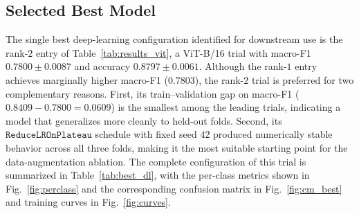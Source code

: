 \documentclass[conference]{IEEEtran}
\begin{document}
\subsection{Selected Best Model}
\label{ssec:best}
The single best deep-learning configuration identified for downstream use is the rank-$2$ entry of Table~\ref{tab:results_vit}, a ViT-B/16 trial with macro-F1 $0.7800 \pm 0.0087$ and accuracy $0.8797 \pm 0.0061$. Although the rank-$1$ entry achieves marginally higher macro-F1 ($0.7803$), the rank-$2$ trial is preferred for two complementary reasons. First, its train--validation gap on macro-F1 ($0.8409 - 0.7800 = 0.0609$) is the smallest among the leading trials, indicating a model that generalizes more cleanly to held-out folds. Second, its $\texttt{ReduceLROnPlateau}$ schedule with fixed seed $42$ produced numerically stable behavior across all three folds, making it the most suitable starting point for the data-augmentation ablation. The complete configuration of this trial is summarized in Table~\ref{tab:best_dl}, with the per-class metrics shown in Fig.~\ref{fig:perclass} and the corresponding confusion matrix in Fig.~\ref{fig:cm_best} and training curves in Fig.~\ref{fig:curves}.
\end{document}
